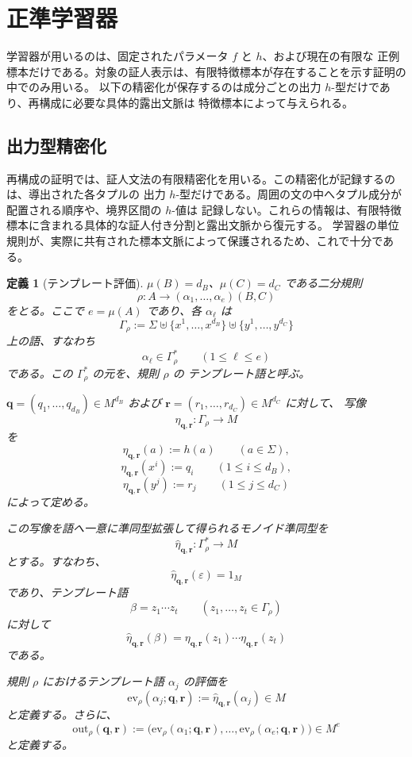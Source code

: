 \documentclass[11pt,a4paper]{ltjsarticle}
\newtheorem{definition}[theorem]{定義}
\theoremstyle{remark}
\newcommand{\out}{\mathrm{out}}
\newcommand{\ev}{\mathrm{ev}}
\newcommand{\eps}{\varepsilon}
\begin{document}
\section{正準学習器}
\label{sec:learner}

学習器が用いるのは、固定されたパラメータ \(f\) と \(h\)、および現在の有限な
正例標本だけである。対象の証人表示は、有限特徴標本が存在することを示す証明の中でのみ用いる。
以下の精密化が保存するのは成分ごとの出力 \(h\)-型だけであり、再構成に必要な具体的露出文脈は
特徴標本によって与えられる。

\subsection{出力型精密化}
\label{sec:refinement}

再構成の証明では、証人文法の有限精密化を用いる。この精密化が記録するのは、導出された各タプルの
出力 \(h\)-型だけである。周囲の文の中へタプル成分が配置される順序や、境界区間の \(h\)-値は
記録しない。これらの情報は、有限特徴標本に含まれる具体的な証人付き分割と露出文脈から復元する。
学習器の単位規則が、実際に共有された標本文脈によって保護されるため、これで十分である。

\begin{definition}[テンプレート評価]
\label{def:output-map}
\(\mu(B)=d_B\)、\(\mu(C)=d_C\) である二分規則
\[
  \rho\colon
  A\to(\alpha_1,\ldots,\alpha_e)(B,C)
\]
をとる。ここで \(e=\mu(A)\) であり、各 \(\alpha_\ell\) は
\[
  \Gamma_\rho
  :=
  \Sigma
  \uplus
  \{x^1,\ldots,x^{d_B}\}
  \uplus
  \{y^1,\ldots,y^{d_C}\}
\]
上の語、すなわち
\[
  \alpha_\ell\in\Gamma_\rho^*
  \qquad (1\le \ell\le e)
\]
である。この \(\Gamma_\rho^*\) の元を、規則 \(\rho\) の
\emph{テンプレート語}と呼ぶ。

\(\mathbf q=(q_1,\ldots,q_{d_B})\in M^{d_B}\) および
\(\mathbf r=(r_1,\ldots,r_{d_C})\in M^{d_C}\) に対して、
写像
\[
  \eta_{\mathbf q,\mathbf r}\colon\Gamma_\rho\to M
\]
を
\[
  \eta_{\mathbf q,\mathbf r}(a):=h(a)
  \qquad (a\in\Sigma),
\]
\[
  \eta_{\mathbf q,\mathbf r}(x^i):=q_i
  \qquad (1\le i\le d_B),
\]
\[
  \eta_{\mathbf q,\mathbf r}(y^j):=r_j
  \qquad (1\le j\le d_C)
\]
によって定める。

この写像を語へ一意に準同型拡張して得られるモノイド準同型を
\[
  \widehat{\eta}_{\mathbf q,\mathbf r}
  \colon
  \Gamma_\rho^*\to M
\]
とする。すなわち、
\[
  \widehat{\eta}_{\mathbf q,\mathbf r}(\eps)=1_M
\]
であり、テンプレート語
\[
  \beta=z_1\cdots z_t
  \qquad (z_1,\ldots,z_t\in\Gamma_\rho)
\]
に対して
\[
  \widehat{\eta}_{\mathbf q,\mathbf r}(\beta)
  =
  \eta_{\mathbf q,\mathbf r}(z_1)
  \cdots
  \eta_{\mathbf q,\mathbf r}(z_t)
\]
である。

規則 \(\rho\) におけるテンプレート語 \(\alpha_j\) の評価を
\[
  \ev_\rho(\alpha_j;\mathbf q,\mathbf r)
  :=
  \widehat{\eta}_{\mathbf q,\mathbf r}(\alpha_j)
  \in M
\]
と定義する。さらに、
\[
  \out_\rho(\mathbf q,\mathbf r)
  :=
  \bigl(
    \ev_\rho(\alpha_1;\mathbf q,\mathbf r),
    \ldots,
    \ev_\rho(\alpha_e;\mathbf q,\mathbf r)
  \bigr)
  \in M^e
\]
と定義する。
\end{definition}
\end{document}
